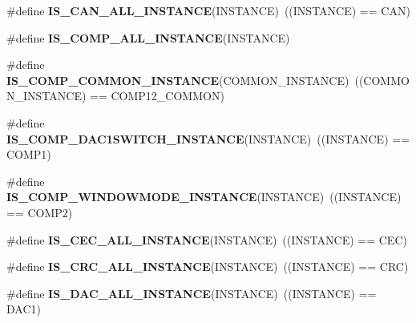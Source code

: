 \begin{DoxyCompactItemize}
\mbox{\label{group___exported__macro_ga974dd363bcb2a5f48ec032509fd4ece3}} 
\#define {\bfseries I\+S\+\_\+\+C\+A\+N\+\_\+\+A\+L\+L\+\_\+\+I\+N\+S\+T\+A\+N\+CE}(I\+N\+S\+T\+A\+N\+CE)~((I\+N\+S\+T\+A\+N\+CE) == C\+AN)
\item 
\#define {\bfseries I\+S\+\_\+\+C\+O\+M\+P\+\_\+\+A\+L\+L\+\_\+\+I\+N\+S\+T\+A\+N\+CE}(I\+N\+S\+T\+A\+N\+CE)
\item 
\mbox{\label{group___exported__macro_gaa7c8a0729f6b2a35ce000556078fa737}} 
\#define {\bfseries I\+S\+\_\+\+C\+O\+M\+P\+\_\+\+C\+O\+M\+M\+O\+N\+\_\+\+I\+N\+S\+T\+A\+N\+CE}(C\+O\+M\+M\+O\+N\+\_\+\+I\+N\+S\+T\+A\+N\+CE)~((C\+O\+M\+M\+O\+N\+\_\+\+I\+N\+S\+T\+A\+N\+CE) == C\+O\+M\+P12\+\_\+\+C\+O\+M\+M\+ON)
\item 
\mbox{\label{group___exported__macro_gaf2340c4592a47c171624fc99e43e4da5}} 
\#define {\bfseries I\+S\+\_\+\+C\+O\+M\+P\+\_\+\+D\+A\+C1\+S\+W\+I\+T\+C\+H\+\_\+\+I\+N\+S\+T\+A\+N\+CE}(I\+N\+S\+T\+A\+N\+CE)~((I\+N\+S\+T\+A\+N\+CE) == C\+O\+M\+P1)
\item 
\mbox{\label{group___exported__macro_gab7f78e841f84bf7ec834748ca685fbc0}} 
\#define {\bfseries I\+S\+\_\+\+C\+O\+M\+P\+\_\+\+W\+I\+N\+D\+O\+W\+M\+O\+D\+E\+\_\+\+I\+N\+S\+T\+A\+N\+CE}(I\+N\+S\+T\+A\+N\+CE)~((I\+N\+S\+T\+A\+N\+CE) == C\+O\+M\+P2)
\item 
\mbox{\label{group___exported__macro_ga10cad35fdea5ffcb9f17973ce98c7dee}} 
\#define {\bfseries I\+S\+\_\+\+C\+E\+C\+\_\+\+A\+L\+L\+\_\+\+I\+N\+S\+T\+A\+N\+CE}(I\+N\+S\+T\+A\+N\+CE)~((I\+N\+S\+T\+A\+N\+CE) == C\+EC)
\item 
\mbox{\label{group___exported__macro_gaa514941a7f02f65eb27450c05e4e8dd1}} 
\#define {\bfseries I\+S\+\_\+\+C\+R\+C\+\_\+\+A\+L\+L\+\_\+\+I\+N\+S\+T\+A\+N\+CE}(I\+N\+S\+T\+A\+N\+CE)~((I\+N\+S\+T\+A\+N\+CE) == C\+RC)
\item 
\mbox{\label{group___exported__macro_ga94426b97cc5f1644d67f291cbcdba6d8}} 
\#define {\bfseries I\+S\+\_\+\+D\+A\+C\+\_\+\+A\+L\+L\+\_\+\+I\+N\+S\+T\+A\+N\+CE}(I\+N\+S\+T\+A\+N\+CE)~((I\+N\+S\+T\+A\+N\+CE) == D\+A\+C1)
\item 

\end{DoxyCompactItemize}

